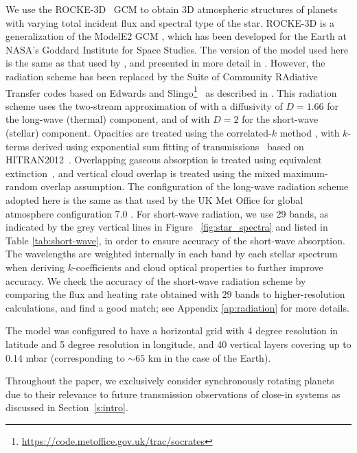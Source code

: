 \documentclass[11pt,numberedappendix,twocolappendix,]{emulateapj}
\def\modelE{ROCKE-3D}
\begin{document}
We use the \modelE{} \ GCM \citep{Way2017} to obtain 3D atmospheric structures of planets with varying total incident flux and spectral type of the star. 
\modelE{} is a generalization of the ModelE2 GCM \citep{Schmidt2014}, which has been developed for the Earth at NASA's Goddard Institute for Space Studies. 
%
The version of the model used here is the same as that used by \citet{Way2016}, and presented in more detail in \citet{Way2017}.
However, the radiation scheme has been replaced by the Suite of Community RAdiative Transfer codes based on Edwards and Slingo\footnote{\url{https://code.metoffice.gov.uk/trac/socrates}}~\citep[SOCRATES,][]{EdwardsSlingo1996,Edwards1996} as described in \citet{Way2017}. 
This radiation scheme uses the two-stream approximation of \citet{Zdunkowski1985} with a diffusivity of $D=1.66$ for the long-wave (thermal) component, and of \citet{Zdunkowski1980} with $D=2$ for the short-wave (stellar) component. 
Opacities are treated using the correlated-$k$ method \citep{Lacis1991,Goody1989}, with $k$-terms derived using exponential sum fitting of transmissions~\citep{Wiscombe1977} based on HITRAN2012~\citep{Rothman2013}. 
Overlapping gaseous absorption is treated using equivalent extinction~\citep{Edwards1996,Amundsen2016}, and vertical cloud overlap is treated using the mixed maximum-random overlap assumption.
The configuration of the long-wave radiation scheme adopted here is the same as that used by the UK Met Office for global atmosphere configuration 7.0 \citep[GA7.0;][]{Walters2017}. 
For short-wave radiation, we use 29 bands, as indicated by the grey vertical lines in Figure ~\ref{fig:star_spectra} and listed in Table \ref{tab:short-wave}, in order to ensure accuracy of the short-wave absorption. 
The wavelengths are weighted internally in each band by each stellar spectrum when deriving $k$-coefficients and cloud optical properties to further improve accuracy. 
We check the accuracy of the short-wave radiation scheme by comparing the flux and heating rate obtained with $29$ bands to higher-resolution calculations, and find a good match; see Appendix \ref{ap:radiation} for more details. 

The model was configured to have a horizontal grid with 4 degree resolution in latitude and 5 degree resolution in longitude, and 40 vertical layers covering up to 0.14 mbar (corresponding to $\sim 65$ km in the case of the Earth). 

Throughout the paper, we exclusively consider synchronously rotating planets due to their relevance to future transmission observations of close-in systems as discussed in Section~\ref{s:intro}. 
\end{document}
